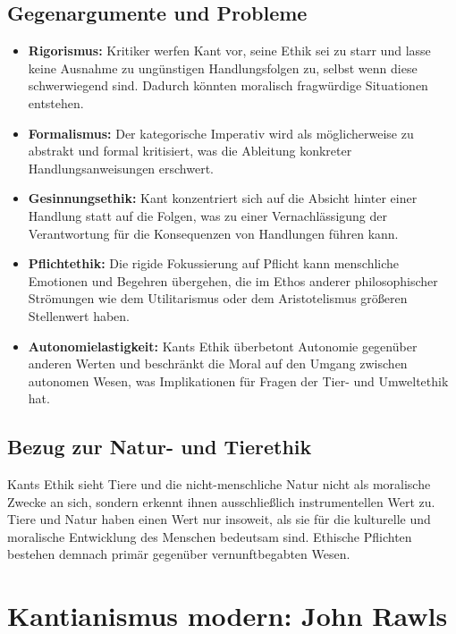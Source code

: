 \documentclass{article}
\begin{document}
\subsection*{Gegenargumente und Probleme}
\begin{itemize}
	\item \textbf{Rigorismus:} Kritiker werfen Kant vor, seine Ethik sei zu starr und lasse keine Ausnahme zu ungünstigen Handlungsfolgen zu, selbst wenn diese schwerwiegend sind. Dadurch könnten moralisch fragwürdige Situationen entstehen.

	\item \textbf{Formalismus:} Der kategorische Imperativ wird als möglicherweise zu abstrakt und formal kritisiert, was die Ableitung konkreter Handlungsanweisungen erschwert.

	\item \textbf{Gesinnungsethik:} Kant konzentriert sich auf die Absicht hinter einer Handlung statt auf die Folgen, was zu einer Vernachlässigung der Verantwortung für die Konsequenzen von Handlungen führen kann.

	\item \textbf{Pflichtethik:} Die rigide Fokussierung auf Pflicht kann menschliche Emotionen und Begehren übergehen, die im Ethos anderer philosophischer Strömungen wie dem Utilitarismus oder dem Aristotelismus größeren Stellenwert haben.

	\item \textbf{Autonomielastigkeit:} Kants Ethik überbetont Autonomie gegenüber anderen Werten und beschränkt die Moral auf den Umgang zwischen autonomen Wesen, was Implikationen für Fragen der Tier- und Umweltethik hat.
\end{itemize}

\subsection*{Bezug zur Natur- und Tierethik}
Kants Ethik sieht Tiere und die nicht-menschliche Natur nicht als moralische Zwecke an sich, sondern erkennt ihnen ausschließlich instrumentellen Wert zu. Tiere und Natur haben einen Wert nur insoweit, als sie für die kulturelle und moralische Entwicklung des Menschen bedeutsam sind. Ethische Pflichten bestehen demnach primär gegenüber vernunftbegabten Wesen.


\newpage
\section{Kantianismus modern: John Rawls}
\end{document}
